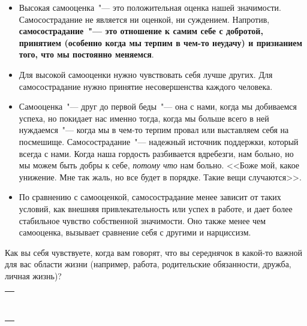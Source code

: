 \begin{itemize}
	\item Высокая самооценка~"--- это положительная оценка нашей значимости. Самосострадание не является ни оценкой, ни суждением. Напротив, \textbf{самосострадание~"--- это отношение к самим себе с добротой, принятием (особенно когда мы терпим в чем-то неудачу) и признанием того, что мы постоянно меняемся}.
	\item Для высокой самооценки нужно чувствовать себя лучше других. Для самосострадание нужно принятие несовершенства каждого человека.
	\item Самооценка~"--- друг до первой беды~"--- она с нами, когда мы добиваемся успеха, но покидает нас именно тогда, когда мы больше всего в ней нуждаемся~"--- когда мы в чем-то терпим провал или выставляем себя на посмешище. Самосострадание~"--- надежный источник поддержки, который всегда с нами. Когда наша гордость разбивается вдребезги, нам больно, но мы можем быть добры к себе, \emph{потому что} нам больно. <<Боже мой, какое унижение. Мне так жаль, но все будет в порядке. Такие вещи случаются>>.
	\item По сравнению с самооценкой, самосострадание менее зависит от таких условий, как внешняя привлекательность или успех в работе, и дает более стабильное чувство собственной значимости. Оно также менее чем самооценка, вызывает сравнение себя с другими и нарциссизм.
\end{itemize}

\newpage


Как вы себя чувствуете, когда вам говорят, что вы середнячок в какой-то важной для вас области жизни (например, работа, родительские обязанности, дружба, личная жизнь)?

\setlength{\extrarowheight}{2mm}
\begin{tabularx}{\textwidth}{X}
	\\
	\arrayrulecolor{gray}\hline\\
	\hline\\
	\hline\\
	\hline\\
	\hline\\
	\hline\\
	\hline\\
	\hline\\
	\hline\\	
\end{tabularx}
\setlength{\extrarowheight}{0mm}

